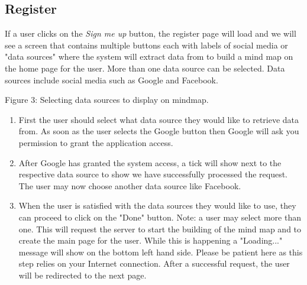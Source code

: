 \documentclass[hidelinks,english]{article}
\begin{document}
    \subsection{Register}
    	If a user clicks on the \textit{Sign me up} button, the register page will load and we will see a screen that contains multiple buttons each with labels of social media or "data sources" where the system will extract data from to build a mind map on the home page for the user. More than one data source can be selected. Data sources include social media such as Google and Facebook.
    	\begin{center}
    	  \caption{Figure 3: Selecting data sources to display on mindmap.}
    	  \label{Select Data}
    	\end{center}

    	\begin{enumerate}  
            \item First the user should select what data source they would like to retrieve data from. As soon as the user selects the Google button then Google will ask you permission to grant the application access.
            \item After Google has granted the system access, a tick will show next to the respective data source to show we have successfully processed the request. The user may now choose another data source like Facebook.
            \item When the user is satisfied with the data sources they would like to use, they can proceed to click on the "Done" button. Note: a user may select more than one. This will request the server to start the building of the mind map and to create the main page for the user. While this is happening a "Loading..." message will show on the bottom left hand side. Please be patient here as this step relies on your Internet connection. After a successful request, the user will be redirected to the next page.
        \end{enumerate}
\end{document}
